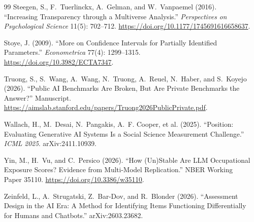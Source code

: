 \documentclass[10pt,letterpaper]{article}
\begin{document}
\begin{thebibliography}{99}
 Steegen, S., F.~Tuerlinckx, A.~Gelman, and W.~Vanpaemel (2016). ``Increasing Transparency through a Multiverse Analysis.'' \textit{Perspectives on Psychological Science} 11(5): 702--712. \url{https://doi.org/10.1177/1745691616658637}.

 Stoye, J. (2009). ``More on Confidence Intervals for Partially Identified Parameters.'' \textit{Econometrica} 77(4): 1299--1315. \url{https://doi.org/10.3982/ECTA7347}.

 Truong, S., S.~Wang, A.~Wang, N.~Truong, A.~Reuel, N.~Haber, and S.~Koyejo (2026). ``Public AI Benchmarks Are Broken, But Are Private Benchmarks the Answer?'' Manuscript. \url{https://aimslab.stanford.edu/papers/Truong2026PublicPrivate.pdf}.

 Wallach, H., M.~Desai, N.~Pangakis, A.~F. Cooper, et al. (2025). ``Position: Evaluating Generative AI Systems Is a Social Science Measurement Challenge.'' \textit{ICML 2025}. arXiv:2411.10939.

 Yin, M., H.~Vu, and C.~Persico (2026). ``How (Un)Stable Are LLM Occupational Exposure Scores? Evidence from Multi-Model Replication.'' NBER Working Paper 35110. \url{https://doi.org/10.3386/w35110}.

 Zeinfeld, L., A.~Strugatski, Z.~Bar-Dov, and R.~Blonder (2026). ``Assessment Design in the AI Era: A Method for Identifying Items Functioning Differentially for Humans and Chatbots.'' arXiv:2603.23682.

\end{thebibliography}
\end{document}
